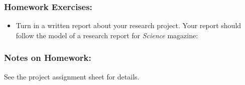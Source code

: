 \documentclass[
]{article}
\providecommand{\tightlist}{%
  \setlength{\itemsep}{0pt}\setlength{\parskip}{0pt}}
\begin{document}
\subsubsection{Homework Exercises:}\label{homework-exercises-12}

\begin{itemize}
\tightlist
\item
  Turn in a written report about your research project. Your report
  should follow the model of a research report for \emph{Science}
  magazine:
\end{itemize}

\subsubsection{Notes on Homework:}\label{notes-on-homework-8}

See the project assignment sheet for details.
\end{document}
